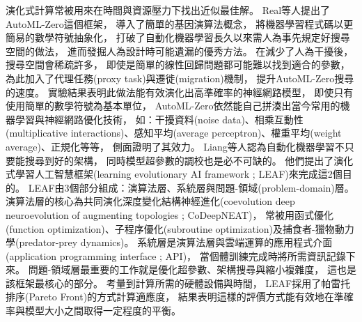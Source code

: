 \documentclass[a4paper,12pt]{extarticle}
\begin{document}
            演化式計算常被用來在時間與資源壓力下找出近似最佳解。
            Real等人\cite{pmlr-v119-real20a}提出了AutoML-Zero這個框架，
            導入了簡單的基因演算法概念，
            將機器學習程式碼以更簡易的數學符號抽象化，
            打破了自動化機器學習長久以來需人為事先規定好搜尋空間的做法，
            進而發掘人為設計時可能遺漏的優秀方法。
            在減少了人為干擾後，
            搜尋空間會稀疏許多，
            即使是簡單的線性回歸問題都可能難以找到適合的參數，
            為此加入了代理任務(proxy task)與遷徙(migration)機制，
            提升AutoML-Zero搜尋的速度。
            實驗結果表明此做法能有效演化出高準確率的神經網路模型，
            即使只有使用簡單的數學符號為基本單位，
            AutoML-Zero依然能自己拼湊出當今常用的機器學習與神經網路優化技術，
            如：干擾資料(noise data)、相乘互動性(multiplicative interactions)、感知平均(average perceptron)、權重平均(weight average)、正規化等等，
            側面證明了其效力。
            Liang等人\cite{10.1145/3321707.3321721}認為自動化機器學習不只要能搜尋到好的架構，
            同時模型超參數的調校也是必不可缺的。
            他們提出了演化式學習人工智慧框架(learning evolutionary AI framework ; LEAF)來完成這2個目的。
            LEAF由3個部分組成：演算法層、系統層與問題-領域(problem-domain)層。
            演算法層的核心為共同演化深度變化結構神經進化(coevolution deep neuroevolution of augmenting topologies ; CoDeepNEAT)，
            常被用函式優化(function optimization)、子程序優化(subroutine optimization)及捕食者-獵物動力學(predator-prey dynamics)。
            系統層是演算法層與雲端運算的應用程式介面(application programming interface ; API)，
            當個體訓練完成時將所需資訊記錄下來。
            問題-領域層最重要的工作就是優化超參數、架構搜尋與縮小複雜度，
            這也是該框架最核心的部分。
            考量到計算所需的硬體設備與時間，
            LEAF採用了帕雷托排序(Pareto Front)的方式計算適應度，
            結果表明這樣的評價方式能有效地在準確率與模型大小之間取得一定程度的平衡。
        
\end{document}
